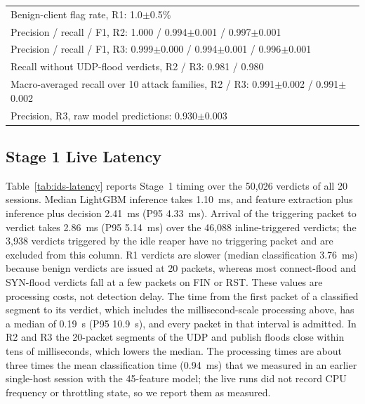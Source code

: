 \documentclass[journal]{IEEEtran}
\begin{document}
\begin{table}[!t]
{\begin{tabular}{lrrrrr}
\midrule
\multicolumn{6}{l}{Benign-client flag rate, R1: 1.0$\pm$0.5\%} \\
\multicolumn{6}{l}{Precision / recall / F1, R2: 1.000 / 0.994$\pm$0.001 / 0.997$\pm$0.001} \\
\multicolumn{6}{l}{Precision / recall / F1, R3: 0.999$\pm$0.000 / 0.994$\pm$0.001 / 0.996$\pm$0.001} \\
\multicolumn{6}{l}{Recall without UDP-flood verdicts, R2 / R3: 0.981 / 0.980} \\
\multicolumn{6}{l}{Macro-averaged recall over 10 attack families, R2 / R3: 0.991$\pm$0.002 / 0.991$\pm$0.002} \\
\multicolumn{6}{l}{Precision, R3, raw model predictions: 0.930$\pm$0.003} \\
\bottomrule
\end{tabular}}
\end{table}

\subsection{Stage 1 Live Latency}
\label{sec:res-ids}

Table~\ref{tab:ids-latency} reports Stage~1 timing over the 50,026 verdicts of all 20 sessions. Median LightGBM inference takes 1.10~ms, and feature extraction plus inference plus decision 2.41~ms (P95 4.33~ms). Arrival of the triggering packet to verdict takes 2.86~ms (P95 5.14~ms) over the 46,088 inline-triggered verdicts; the 3,938 verdicts triggered by the idle reaper have no triggering packet and are excluded from this column. R1 verdicts are slower (median classification 3.76~ms) because benign verdicts are issued at 20 packets, whereas most connect-flood and SYN-flood verdicts fall at a few packets on FIN or RST. These values are processing costs, not detection delay. The time from the first packet of a classified segment to its verdict, which includes the millisecond-scale processing above, has a median of 0.19~s (P95 10.9~s), and every packet in that interval is admitted. In R2 and R3 the 20-packet segments of the UDP and publish floods close within tens of milliseconds, which lowers the median. The processing times are about three times the mean classification time (0.94~ms) that we measured in an earlier single-host session with the 45-feature model; the live runs did not record CPU frequency or throttling state, so we report them as measured.
\end{document}
